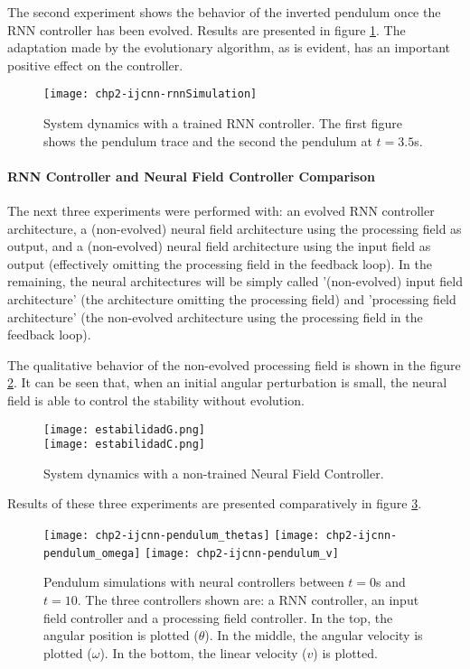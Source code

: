 The second experiment shows the behavior of the inverted pendulum once
the RNN controller has been evolved. Results are presented in figure
\ref{rnnSimulation}. The adaptation made by the evolutionary
algorithm, as is evident, has an important positive effect on the
controller.

\begin{figure}[h]
  \centering
  \texttt{[image: chp2-ijcnn-rnnSimulation]}
  \caption{System dynamics with a trained RNN controller. The first
    figure shows the pendulum trace and the second the pendulum at
    $t=3.5$s.}
  \label{rnnSimulation}
\end{figure}

\paragraph{RNN Controller and Neural Field Controller Comparison}
The next three experiments were performed with: an evolved RNN
controller architecture, a (non-evolved) neural field architecture
using the processing field as output, and a (non-evolved) neural field
architecture using the input field as output (effectively omitting the
processing field in the feedback loop). In the remaining, the neural
architectures will be simply called '(non-evolved) input field
architecture' (the architecture omitting the processing field) and
'processing field architecture' (the non-evolved architecture using
the processing field in the feedback loop).

The qualitative behavior of the non-evolved processing field is shown
in the figure \ref{estabilidad}. It can be seen that, when an initial
angular perturbation is small, the neural field is able to control the
stability without evolution.

\begin{figure}[h]
  \centering
  \texttt{[image: estabilidadG.png]}
  \\
  \texttt{[image: estabilidadC.png]}
  \caption{System dynamics with a non-trained Neural Field
    Controller.}
  \label{estabilidad}
\end{figure}

Results of these three experiments are presented comparatively in
figure \ref{fig:pendulum-plot}.

\begin{figure}[p]
  \centering
  \texttt{[image: chp2-ijcnn-pendulum\_thetas]}
  \texttt{[image: chp2-ijcnn-pendulum\_omega]}
  \texttt{[image: chp2-ijcnn-pendulum\_v]}
  \caption{Pendulum simulations with neural controllers between $t=0$s
    and $t=10$. The three controllers shown are: a RNN controller, an
    input field controller and a processing field controller. In the
    top, the angular position is plotted ($\theta$). In the middle,
    the angular velocity is plotted ($\omega$). In the bottom, the
    linear velocity ($v$) is plotted.}
  \label{fig:pendulum-plot}
\end{figure}

